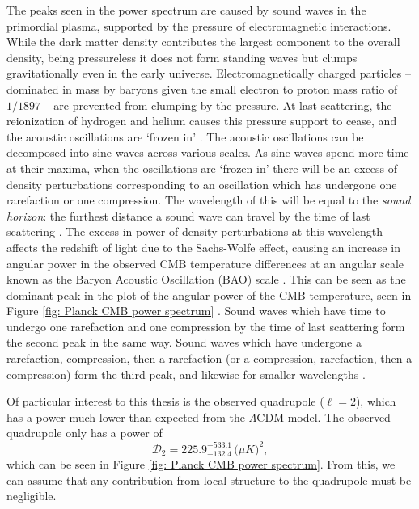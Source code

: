 \documentclass[a4paper,12pt]{report}
\begin{document}
The peaks seen in the power spectrum are caused by sound waves in the primordial plasma, supported by the pressure of electromagnetic interactions. While the dark matter density contributes the largest component to the overall density, being pressureless it does not form standing waves but clumps gravitationally even in the early universe. Electromagnetically charged particles -- dominated in mass by baryons given the small electron to proton mass ratio of $1/1897$ -- are prevented from clumping by the pressure. At last scattering, the reionization of hydrogen and helium causes this pressure support to cease, and the acoustic oscillations are `frozen in' \cite{RN221}. The acoustic oscillations can be decomposed into sine waves across various scales. As sine waves spend more time at their maxima, when the oscillations are `frozen in' there will be an excess of density perturbations corresponding to an oscillation which has undergone one rarefaction or one compression. The wavelength of this will be equal to the \textit{sound horizon}: the furthest distance a sound wave can travel by the time of last scattering \cite{RN176}. The excess in power of density perturbations at this wavelength affects the redshift of light due to the Sachs-Wolfe effect, causing an increase in angular power in the observed CMB temperature differences at an angular scale known as the Baryon Acoustic Oscillation (BAO) scale \cite{RN222}. This can be seen as the dominant peak in the plot of the angular power of the CMB temperature, seen in Figure \ref{fig: Planck CMB power spectrum} \cite{RN176,RN223}. Sound waves which have time to undergo one rarefaction and one compression by the time of last scattering form the second peak in the same way. Sound waves which have undergone a rarefaction, compression, then a rarefaction (or a compression, rarefaction, then a compression) form the third peak, and likewise for smaller wavelengths \cite{RN224}.

Of particular interest to this thesis is the observed quadrupole ($\ell=2$), which has a power much lower than expected from the $\Lambda$CDM model. The observed quadrupole only has a power of \cite{RN175}
\begin{equation}
  \mathcal{D}_2 = 225.9^{+533.1}_{-132.4}\, (\mu\si{K)^2},
\end{equation}
which can be seen in Figure \ref{fig: Planck CMB power spectrum}. From this, we can assume that any contribution from local structure to the quadrupole must be negligible.

\end{document}
